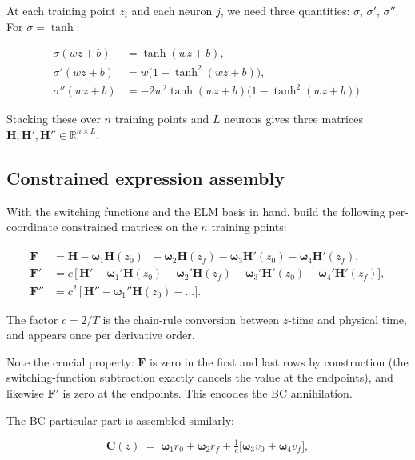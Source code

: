 \documentclass[8pt,a4paper]{article}
\newcommand{\R}{\mathbb{R}}
\newcommand{\bvec}[1]{\bm{#1}}
\newcommand{\Fmat}{\bvec{F}}
\newcommand{\Hmat}{\bvec{H}}
\theoremstyle{definition}
\theoremstyle{remark}
\begin{document}
At each training point $z_i$ and each neuron $j$, we need three
quantities: $\sigma$, $\sigma'$, $\sigma''$. For $\sigma = \tanh$:

\begin{align}
  \sigma(w z + b) &= \tanh(w z + b), \\
  \sigma'(w z + b) &= w\big(1 - \tanh^2(w z + b)\big), \\
  \sigma''(w z + b) &= -2 w^2 \tanh(w z + b)\big(1 - \tanh^2(w z + b)\big).
\end{align}

Stacking these over $n$ training points and $L$ neurons gives three
matrices $\Hmat, \Hmat', \Hmat'' \in \R^{n \times L}$.

\subsection{Constrained expression assembly}

With the switching functions and the ELM basis in hand, build the
following per-coordinate constrained matrices on the $n$ training
points:

\begin{align}
  \Fmat     &= \Hmat
              - \bvec{\omega}_1 \Hmat(z_0)^{\phantom\top}
              - \bvec{\omega}_2 \Hmat(z_f)
              - \bvec{\omega}_3 \Hmat'(z_0)
              - \bvec{\omega}_4 \Hmat'(z_f), \\
  \Fmat'    &= c\,\Big[\,\Hmat'
              - \bvec{\omega}_1' \Hmat(z_0)
              - \bvec{\omega}_2' \Hmat(z_f)
              - \bvec{\omega}_3' \Hmat'(z_0)
              - \bvec{\omega}_4' \Hmat'(z_f)\Big], \\
  \Fmat''   &= c^2\,\Big[\,\Hmat''
              - \bvec{\omega}_1'' \Hmat(z_0) - \dots\Big].
\end{align}

The factor $c = 2/T$ is the chain-rule conversion between $z$-time
and physical time, and appears once per derivative order.

Note the crucial property: $\Fmat$ is zero in the first and last
rows by construction (the switching-function subtraction exactly
cancels the value at the endpoints), and likewise $\Fmat'$ is zero
at the endpoints. This encodes the BC annihilation.

The BC-particular part is assembled similarly:

\begin{equation}
  \bvec{C}(z) \;=\; \bvec{\omega}_1 r_0 + \bvec{\omega}_2 r_f
      + \tfrac{1}{c}\big[\bvec{\omega}_3 v_0 + \bvec{\omega}_4 v_f\big],
\end{equation}
\end{document}
